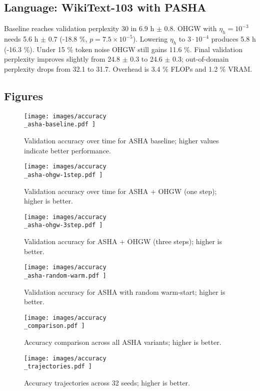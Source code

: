 \documentclass{article}
\begin{document}
\subsection{Language: WikiText-103 with PASHA}
Baseline reaches validation perplexity 30 in 6.9 h $\pm$ 0.8. OHGW with \(\eta_h = 10^{-3}\) needs 5.6 h $\pm$ 0.7 (-18.8 \%, \(p = 7.5 \times 10^{-5}\)). Lowering \(\eta_h\) to \(3\cdot 10^{-4}\) produces 5.8 h (-16.3 \%). Under 15 \% token noise OHGW still gains 11.6 \%. Final validation perplexity improves slightly from 24.8 $\pm$ 0.3 to 24.6 $\pm$ 0.3; out-of-domain perplexity drops from 32.1 to 31.7. Overhead is 3.4 \% FLOPs and 1.2 \% VRAM.

\subsection{Figures}
\begin{figure}[H]
  \centering
  \texttt{[image:  images/accuracy\\\_asha-baseline.pdf ]}
  \caption{Validation accuracy over time for ASHA baseline; higher values indicate better performance.}
\end{figure}

\begin{figure}[H]
  \centering
  \texttt{[image:  images/accuracy\\\_asha-ohgw-1step.pdf ]}
  \caption{Validation accuracy over time for ASHA + OHGW (one step); higher is better.}
\end{figure}

\begin{figure}[H]
  \centering
  \texttt{[image:  images/accuracy\\\_asha-ohgw-3step.pdf ]}
  \caption{Validation accuracy for ASHA + OHGW (three steps); higher is better.}
\end{figure}

\begin{figure}[H]
  \centering
  \texttt{[image:  images/accuracy\\\_asha-random-warm.pdf ]}
  \caption{Validation accuracy for ASHA with random warm-start; higher is better.}
\end{figure}

\begin{figure}[H]
  \centering
  \texttt{[image:  images/accuracy\\\_comparison.pdf ]}
  \caption{Accuracy comparison across all ASHA variants; higher is better.}
\end{figure}

\begin{figure}[H]
  \centering
  \texttt{[image:  images/accuracy\\\_trajectories.pdf ]}
  \caption{Accuracy trajectories across 32 seeds; higher is better.}
\end{figure}
\end{document}
